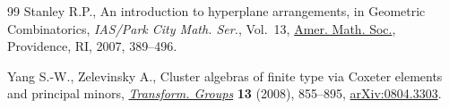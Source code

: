 \documentclass[10pt,a4paper]{amsart}
\numberwithin{equation}{section}
\begin{document}
\begin{thebibliography}{99}
Stanley R.P., An introduction to hyperplane arrangements, in Geometric
 Combinatorics, \textit{IAS/Park City Math. Ser.}, Vol.~13, \href{https://doi.org/10.1090/pcms/013/08}{Amer. Math. Soc.},
 Providence, RI, 2007, 389--496.

Yang S.-W., Zelevinsky A., Cluster algebras of finite type via {C}oxeter
 elements and principal minors, \href{https://doi.org/10.1007/s00031-008-9025-x}{\textit{Transform. Groups}} \textbf{13} (2008),
 855--895, \href{https://arxiv.org/abs/0804.3303}{arXiv:0804.3303}.

\end{thebibliography}
\end{document}
